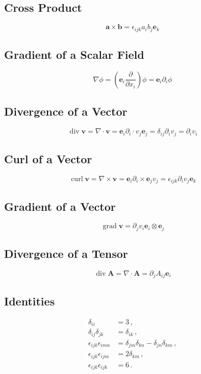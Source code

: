 \documentclass[letterpaper,12pt]{article}
\DeclareMathOperator*{\tgrad}{grad}
\DeclareMathOperator*{\tdiv}{div}
\DeclareMathOperator*{\tcurl}{curl}
\begin{document}
\subsection*{Cross Product}
\[
\mathbf{a}\times\mathbf{b}=\epsilon_{ijk}a_i b_j\mathbf{e}_k
\]

\subsection*{Gradient of a Scalar Field}
\[
\nabla\phi=\left(\mathbf{e}_i\frac{\partial}{\partial x_i}\right)\phi
=\mathbf{e}_i\partial_i\phi
\]

\subsection*{Divergence of a Vector}
\[
 \tdiv\mathbf{v}=\nabla\cdot\mathbf{v}=\mathbf{e}_i\partial_i\cdot
v_j\mathbf{e}_j=\delta_{ij}\partial_i v_j=\partial_i v_i
\]

\subsection*{Curl of a Vector}
\[
\tcurl\mathbf{v}=\nabla\times\mathbf{v}=\mathbf{e}_i\partial_i\times\mathbf{e}
_j v_j=\epsilon_{ijk}\partial_i v_j\mathbf{e}_k
\]

\subsection*{Gradient of a Vector}
\[
\tgrad\mathbf{v}=\partial_j v_i\mathbf{e}_i\otimes\mathbf{e}_j
\]

\subsection*{Divergence of a Tensor}
\[
\tdiv\mathbf{A}=\nabla\cdot\mathbf{A}=\partial_j A_{ij}\mathbf{e}_i
\]

\subsection*{Identities}
\begin{align*}
\delta_{ii}&=3\,,\\
\delta_{ij}\delta_{jk}&=\delta_{ik}\,,\\
\epsilon_{ijk}\epsilon_{imn}&=\delta_{jm}\delta_{kn}-\delta_{jn}\delta_{km}\,,\\
\epsilon_{ijk}\epsilon_{ijm}&=2\delta_{km}\,,\\
\epsilon_{ijk}\epsilon_{ijk}&=6\,.
\end{align*}
\end{document}

